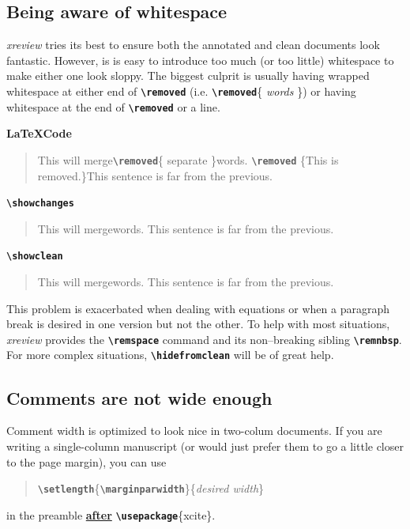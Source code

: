 \documentclass[a4paper]{ltxdoc}
\newcommand{\writecommand}[1]{\texttt{\textbf{{\textbackslash#1}}}}
\newcommand{\writearg}[1]{\{#1\}}
\begin{document}
\subsection{Being aware of whitespace}

\textit{xreview} tries its best to ensure both the annotated and clean documents look fantastic. However, is is easy to introduce too much (or too little) whitespace to make either one look sloppy. The biggest culprit is usually having wrapped whitespace at either end of \writecommand{removed} (i.e. \writecommand{removed}\writearg{ \textit{words} }) or having whitespace at the end of \writecommand{removed} or a line.

\textbf{\LaTeX Code}

\begin{quote}
    This will merge\writecommand{removed}\writearg{ separate }words.
    \writecommand{removed} \writearg{This is removed.}\textvisiblespace This sentence is far from the previous. 
\end{quote}

\writecommand{showchanges}
\showchanges

\begin{quote}
    This will mergewords.
     This sentence is far from the previous. 
\end{quote}

\writecommand{showclean}
\showclean

\begin{quote}
    This will mergewords.
     This sentence is far from the previous. 
\end{quote}

\showchanges

This problem is exacerbated when dealing with equations or when a paragraph break is desired in one version but not the other. 
To help with most situations, \textit{xreview} provides the \writecommand{remspace} command and its non--breaking sibling \writecommand{remnbsp}.
For more complex situations, \writecommand{hidefromclean} will be of great help.

\subsection{Comments are not wide enough}

Comment width is optimized to look nice in two-colum documents. If you are writing a single-column manuscript (or would just prefer them to go a little closer to the page margin), you can use 
\begin{quote}
    \writecommand{setlength}\writearg{\writecommand{marginparwidth}}\writearg{\textit{desired width}}
\end{quote}
in the preamble \underline{\textbf{after}} \writecommand{usepackage}\writearg{xcite}.
\end{document}
